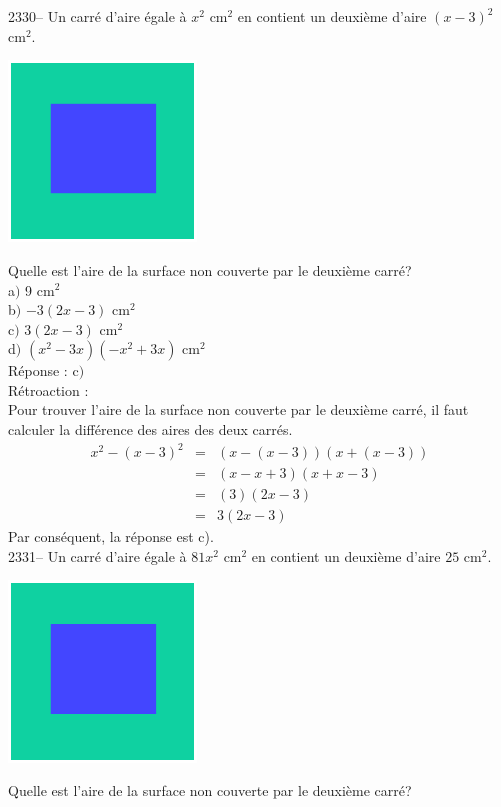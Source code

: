 \documentclass[letterpaper, 12pt]{article}
\begin{document}
2330-- Un carr\'e d'aire \'egale \`a $x^{2}$ cm$^{2}$ en contient un deuxi\`eme d'aire $(x-3)^{2}$ cm$^{2}$.\\
\begin{center}
 \includegraphics[width=5cm,bb=14 14 435 315]{Q2330.eps}
\end{center}
Quelle est l'aire de la surface non couverte par le deuxi\`eme carr\'e?\\

a$)$ 9 cm$^{2}$\\
b$)$ $-3(2x-3)$ cm$^{2}$\\
c$)$ $3(2x-3)$ cm$^{2}$\\
d$)$ $(x^{2}-3x)(-x^{2}+3x)$ cm$^{2}$\\

R\'eponse : c$)$\\

R\'etroaction :\\
Pour trouver l'aire de la surface non couverte par le deuxi\`eme carr\'e, il faut calculer la diff\'erence des aires des deux carr\'es.
\begin{eqnarray*}
 x^{2}-(x-3)^{2}&=&(x-(x-3))(x+(x-3))\\
&=& (x-x+3)(x+x-3)\\
&=& (3)(2x-3)\\
&=& 3(2x-3)
\end{eqnarray*}
Par cons\'equent, la r\'eponse est c).\\

2331--  Un carr\'e d'aire \'egale \`a $81x^{2}$ cm$^{2}$ en contient un deuxi\`eme d'aire $25$ cm$^{2}$.\\
\begin{center}
 \includegraphics[width=5cm,bb=14 14 435 315]{Q2330.eps}
\end{center}
Quelle est l'aire de la surface non couverte par le deuxi\`eme carr\'e?\\
\end{document}
